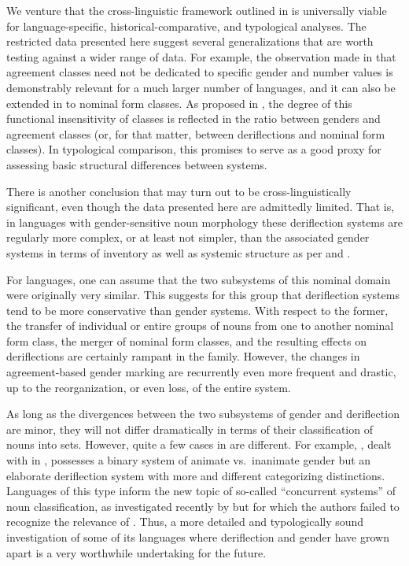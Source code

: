 \documentclass[output=collectionpaper]{langsci/langscibook}
\begin{document}
We venture that the cross-linguistic framework outlined in  is universally viable for language-specific, historical-comparative, and typological analyses. The restricted data presented here suggest several generalizations that are worth testing against a wider range of data. For example, the observation made in \citet{Gueldemann2000} that agreement classes need not be dedicated to specific gender and number values is demonstrably relevant for a much larger number of languages, and it can also be extended in  to nominal form classes. As proposed in \citet{Gueldemann2000}, the degree of this functional insensitivity of classes is reflected in the ratio between genders and agreement classes (or, for that matter, between deriflections and nominal form classes). In typological comparison, this promises to serve as a good proxy for assessing basic structural differences between systems.

There is another conclusion that may turn out to be cross-linguistically significant, even though the data presented here are admittedly limited. That is, in languages with gender-sensitive noun morphology these deriflection systems are regularly more complex, or at least not simpler, than the associated gender systems in terms of inventory as well as systemic structure as per \citet{Heine1982} and \citet{Corbett1991}.

For  languages, one can assume that the two subsystems of this nominal domain were originally very similar. This suggests for this group that deriflection systems tend to be more conservative than gender systems. With respect to the former, the transfer of individual or entire groups of nouns from one to another nominal form class, the merger of nominal form classes, and the resulting effects on deriflections are certainly rampant in the family. However, the changes in agreement-based gender marking are recurrently even more frequent and drastic, up to the reorganization, or even loss, of the entire system.

As long as the divergences between the two subsystems of gender and deriflection are minor, they will not differ dramatically in terms of their classification of nouns into sets. However, quite a few cases in  are different. For example, , dealt with in , possesses a binary system of animate vs.\ inanimate gender but an elaborate deriflection system with more and different categorizing distinctions. Languages of this type inform the new topic of so-called ``concurrent systems'' of noun classification, as investigated recently by  \citet{Fedden2017} but for which the authors failed to recognize the relevance of . Thus, a more detailed and typologically sound investigation of some of its languages where deriflection and gender have grown apart is a very worthwhile undertaking for the future.
\end{document}

